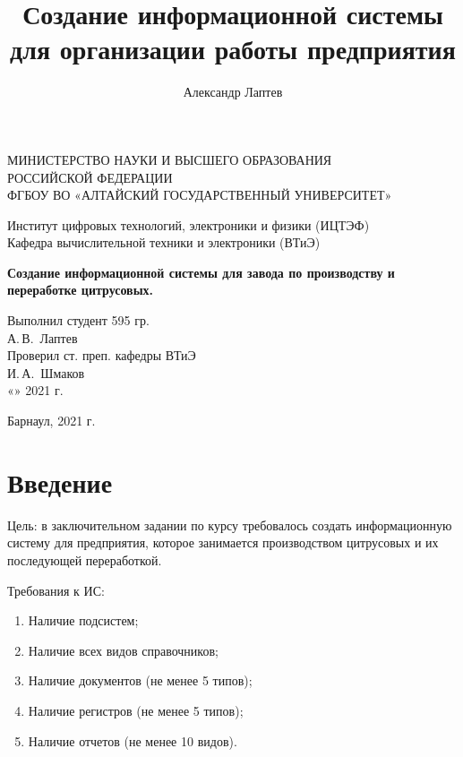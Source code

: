 \documentclass[12pt,a4paper]{article}
\author{Александр Лаптев}
\title{Создание информационной системы для организации работы предприятия}
\begin{document}
\begin{titlepage}
 \begin{center}
    \normalsize
    МИНИСТЕРСТВО НАУКИ И ВЫСШЕГО ОБРАЗОВАНИЯ \\
    РОССИЙСКОЙ ФЕДЕРАЦИИ \\
    ФГБОУ ВО «АЛТАЙСКИЙ ГОСУДАРСТВЕННЫЙ УНИВЕРСИТЕТ»
    \vfill
     
    Институт цифровых технологий, электроники и физики (ИЦТЭФ) \\
    Кафедра вычислительной техники и электроники (ВТиЭ)
    \vfill
     
    \textbf{Создание информационной системы для завода по производству и переработке цитрусовых.} \\
 \end{center}
\vfill
 
\newlength{\ML}
\hfill\begin{minipage}{0.4\textwidth}
  Выполнил студент 595 гр.\\
  \underline{\hspace{\ML}} А.\,В.~Лаптев \\
  Проверил ст. преп. кафедры ВТиЭ\\
  \underline{\hspace{\ML}} И.\,А.~Шмаков \\
  «\underline{\hspace{1cm}}» \underline{\hspace{3cm}} 2021 г.
\end{minipage}%
\vfill
 
\begin{center}
  Барнаул, 2021 г.
\end{center}
\end{titlepage}

\tableofcontents
\newpage

\section*{Введение}
Цель: в заключительном задании по курсу требовалось создать информационную систему для предприятия, которое занимается производством цитрусовых и их последующей переработкой.
    
Требования к ИС:
\begin{enumerate}
    \item Наличие подсистем;
    
    \item Наличие всех видов справочников;
    
    \item Наличие документов (не менее 5 типов);
    
    \item Наличие регистров (не менее 5 типов);
    
    \item Наличие отчетов (не менее 10 видов).
\end{enumerate}
\end{document}
